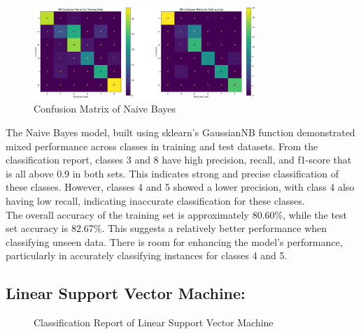 \documentclass[11pt, letterpaper]{article}
\begin{document}
    \begin{figure}[H]
        \centering
        \includegraphics[width=0.75\textwidth]{nb-confusion-matrix.png}
        \caption{Confusion Matrix of Naive Bayes}
        \label{fig:confusion-matrix-nb}
    \end{figure}

    \noindent The Naive Bayes model, built using sklearn’s GaussianNB function demonstrated mixed performance across classes in training and test datasets. From the classification report, classes 3 and 8 have high precision, recall, and f1-score that is all above 0.9 in both sets. This indicates strong and precise classification of these classes. However, classes 4 and 5 showed a lower precision, with class 4 also having low recall, indicating inaccurate classification for these classes.\\
    
    \noindent The overall accuracy of the training set is approximately 80.60\%, while the test set accuracy is 82.67\%. This suggests a relatively better performance when classifying unseen data. There is room for enhancing the model’s performance, particularly in accurately classifying instances for classes 4 and 5.
    
    \noindent\subsection*{Linear Support Vector Machine:}

    \begin{figure}[H]
        \centering
        \qquad
        \caption{Classification Report of Linear Support Vector Machine}
        \label{fig:example}
    \end{figure}
\end{document}
